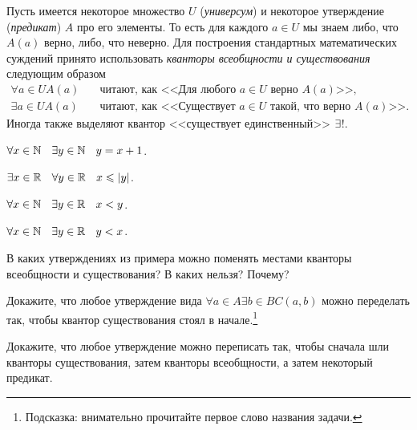 \documentclass[a4paper, 12pt, num=24]{listok}
\begin{document}
\begin{definition}
    Пусть имеется некоторое множество $U$ (\textit{универсум})
    и некоторое утверждение (\textit{предикат}) $A$ про его элементы.
    То есть для каждого $a \in U$ мы знаем либо, что $A(a)$ верно, либо, что неверно.
    Для построения стандартных математических суждений принято использовать \textit{кванторы всеобщности и существования} следующим образом
    \begin{align*}
        \forall{a \in U} A(a) &\quad\text{читают, как <<Для любого $a \in U$ верно $A(a)$>>},\\
        \exists{a \in U} A(a) &\quad\text{читают, как <<Существует $a \in U$ такой, что верно $A(a)$>>}.
    \end{align*}
    Иногда также выделяют квантор <<существует единственный>> $\existssym$!.
\end{definition}
\begin{example}
    \phantom{000}
    \begin{multienum}{2}
        \item $\forall{x \in \N} \exists{y \in \N} y = x + 1$.
        \item $\exists{x \in \R} \forall{y \in \R} x \le |y|$.
        \item $\forall{x \in \N} \exists{y \in \R} x < y$.
        \item $\forall{x \in \N} \exists{y \in \R} y < x$.
    \end{multienum}
\end{example}
\begin{problem}
\begin{probparts}
    \item В каких утверждениях из примера можно поменять местами кванторы всеобщности и существования? В каких нельзя? Почему?
    \item Докажите, что любое утверждение вида $\forall{a \in A} \exists{b \in B} C(a, b)$ можно переделать так, чтобы квантор существования стоял в начале.\footnote{%
        Подсказка: внимательно прочитайте первое слово названия задачи.}
    \item Докажите, что любое утверждение можно переписать так, чтобы сначала шли кванторы существования, затем кванторы всеобщности, а затем некоторый предикат.
\end{probparts}
\end{problem}
\end{document}
